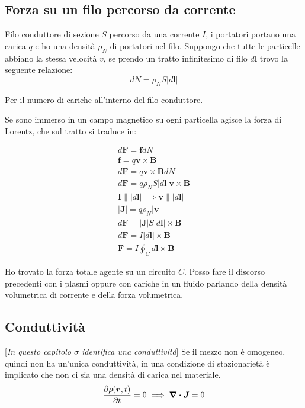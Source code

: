 \documentclass[a4paper]{scrarticle}
\begin{document}
\subsection*{Forza su un filo percorso da corrente}

Filo conduttore di sezione $S$ percorso da una corrente $I$, i portatori portano una carica $q$ e ho una densità $\rho_N$ di portatori nel filo.
Suppongo che tutte le particelle abbiano la stessa velocità $v$, se prendo un tratto infinitesimo di filo $d\bm l $ trovo la seguente relazione:
\begin{equation*}
    dN = \rho_N S |d\bm l|
\end{equation*}

Per il numero di cariche all'interno del filo conduttore.

Se sono immerso in un campo magnetico su ogni particella agisce la forza di Lorentz, che sul tratto si traduce in:

\begin{gather*}
    d \bm F = \bm f  dN\\
    \bm f = q \bm v \times \bm B\\
    d \bm F = q \bm v \times \bm B  dN\\
    d \bm F = q \rho_N S |d\bm l| \bm v \times \bm B\\
    \bm I \parallel |d \bm l| \implies \bm v \parallel |d \bm l|\\
    |\bm J| = q \rho_N |\bm v|\\ 
    d \bm F = |\bm J| S |d\bm l| \times \bm B\\
    d \bm F = I |d\bm l| \times \bm B\\
    \bm F = I \oint_C d\bm l \times \bm B
\end{gather*}

Ho trovato la forza totale agente su un circuito $C$.
Posso fare il discorso precedenti con i plasmi oppure  con cariche in un fluido parlando della densità volumetrica di corrente e della forza volumetrica.

\subsection{Conduttività}
[\emph{In questo capitolo $\sigma$ identifica una conduttività}]
Se il mezzo non è omogeneo, quindi non ha un'unica conduttività, in una condizione di stazionarietà è implicato che non ci sia una densità di carica nel materiale.
\begin{equation*}
    \pdv{\rho(\bm r , t)}{t} = 0 \implies \div{\bm J} = 0
\end{equation*}
\end{document}
